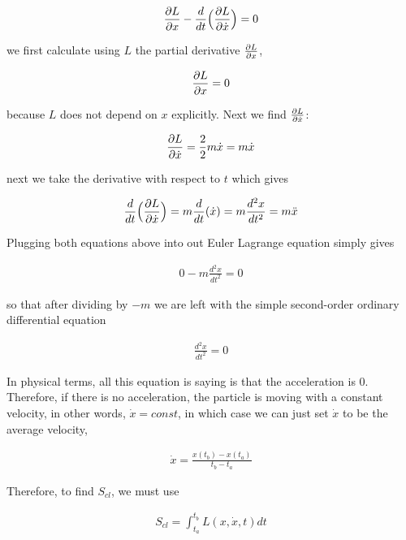 \documentclass{article}
\begin{document}
\begin{align*}
         \pdv{L}{x} - \frac{d}{dt}\Big( \pdv{L}{\dot{x}} \Big) = 0
\end{align*}

we first calculate using $L$ the partial derivative $\pdv{L}{x}$, 

\begin{align*}
    \pdv{L}{x} = 0
\end{align*}

because $L$ does not depend on $x$ explicitly. Next we find $\pdv{L}{\dot{x}}$:

\begin{align*}
         \pdv{L}{\dot{x}} = \frac{2}{2}m\dot{x} = m\dot{x}
\end{align*}

next we take the derivative with respect to $t$ which gives 

\begin{align*}
         \frac{d}{dt}\Big( \pdv{L}{\dot{x}} \Big) = m\frac{d}{dt}(\dot{x}) = m\frac{d^{2}x}{dt^{2}} = m\Ddot{x}
\end{align*}

Plugging both equations above into out Euler Lagrange equation simply gives  

\begin{align*}
         0 - m\frac{d^{2}x}{dt^{2}} = 0
\end{align*}

so that after dividing by $-m$ we are left with the simple second-order ordinary differential equation 

\begin{align*}
         \frac{d^{2}x}{dt^{2}} = 0
\end{align*}

In physical terms, all this equation is saying is that the acceleration is $0$. Therefore, if there is no acceleration, the particle is moving with a constant velocity, in other words, $\dot{x} = const$, in which case we can just set $\dot{x}$ to be the average velocity,

\begin{align*}
    \dot{x} = \frac{x(t_{b}) - x(t_{a})}{t_{b} - t_{a}}
\end{align*}

Therefore, to find $S_{cl}$, we must use 

\begin{align*}
    S_{cl} = \int_{t_{a}}^{t_{b}} L(x,\dot{x},t) dt
\end{align*}
\end{document}
